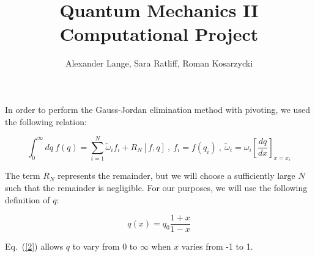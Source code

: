 \documentclass{homework}
\title{Quantum Mechanics II Computational Project}
\author{Alexander Lange, Sara Ratliff, Roman Kosarzycki}
\begin{document}
\maketitle

In order to perform the Gauss-Jordan elimination method with pivoting, we used the following relation:

\begin{equation}
\label{1}
\int^{\infty}_0 dq \ f(q) = \sum^N_{i=1} \tilde{\omega}_if_i + R_N[f,q] \ , \ f_i=f(q_i) \ , \ \tilde{\omega}_i = \omega_i \left[ \frac{dq}{dx} \right]_{x=x_i}
\end{equation}

The term $R_N$ represents the remainder, but we will choose a sufficiently large $N$ such that the remainder is negligible. For our purposes, we will use the following definition of $q$:

\begin{equation}
\label{2}
q(x)= q_0 \frac{1+x}{1-x}
\end{equation}

Eq.~(\ref{2}) allows $q$ to vary from 0 to $\infty$ when $x$ varies from -1 to 1. 
\end{document}

